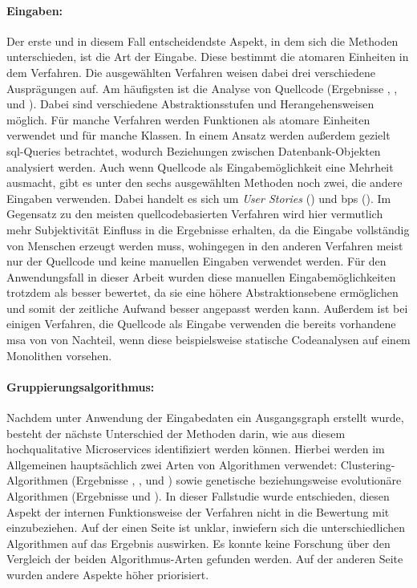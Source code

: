 \paragraph{Eingaben:} Der erste und in diesem Fall entscheidendste Aspekt, in dem sich die Methoden unterschieden, ist die Art der Eingabe.
Diese bestimmt die atomaren Einheiten in dem Verfahren.
Die ausgewählten Verfahren weisen dabei drei verschiedene Ausprägungen auf.
Am häufigsten ist die Analyse von Quellcode (Ergebnisse , ,  und ).
Dabei sind verschiedene Abstraktionsstufen und Her\-an\-ge\-hens\-wei\-sen möglich.
Für manche Verfahren werden Funktionen als atomare Einheiten verwendet und für manche Klassen.
In einem Ansatz werden außerdem gezielt \gls{sql}-Queries betrachtet, wodurch Beziehungen zwischen Datenbank-Objekten analysiert werden.
Auch wenn Quellcode als Eingabemöglichkeit eine Mehrheit ausmacht, gibt es unter den sechs ausgewählten Methoden noch zwei, die andere Eingaben verwenden.
Dabei handelt es sich um \emph{User Stories} () und \glspl{bp} ().
Im Gegensatz zu den meisten quellcodebasierten Verfahren wird hier vermutlich mehr Subjektivität Einfluss in die Ergebnisse erhalten, da die Eingabe vollständig von Menschen erzeugt werden muss, wohingegen in den anderen Verfahren meist nur der Quellcode und keine manuellen Eingaben verwendet werden.
Für den Anwendungsfall in dieser Arbeit wurden diese manuellen Eingabemöglichkeiten trotzdem als besser bewertet, da sie eine höhere Abstraktionsebene ermöglichen und somit der zeitliche Aufwand besser angepasst werden kann.
Außerdem ist bei einigen Verfahren, die Quellcode als Eingabe verwenden die bereits vorhandene \gls{msa} von \jf von Nachteil, wenn diese beispielsweise statische Codeanalysen auf einem Monolithen vorsehen.

\paragraph{Gruppierungsalgorithmus:} 
Nachdem unter Anwendung der Eingabedaten ein Ausgangsgraph erstellt wurde, besteht der nächste Unterschied der Methoden darin, wie aus diesem hochqualitative Microservices identifiziert werden können.
Hierbei werden im Allgemeinen hauptsächlich zwei Arten von Algorithmen verwendet: Clustering-Algorithmen (Ergebnisse , ,  und ) sowie genetische beziehungsweise evolutionäre Algorithmen (Ergebnisse  und ).
In dieser Fallstudie wurde entschieden, diesen Aspekt der internen Funktionsweise der Verfahren nicht in die Bewertung mit einzubeziehen.
Auf der einen Seite ist unklar, inwiefern sich die unterschiedlichen Algorithmen auf das Ergebnis auswirken.
Es konnte keine Forschung über den Vergleich der beiden Algorithmus-Arten gefunden werden.
Auf der anderen Seite wurden andere Aspekte höher priorisiert.

